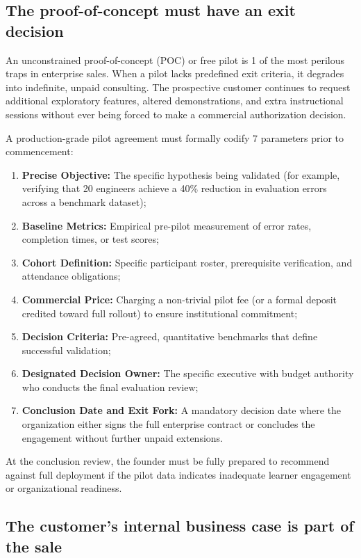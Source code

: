 \subsection{The proof-of-concept must have an exit decision}

An unconstrained proof-of-concept (POC) or free pilot is 1 of the most perilous traps in enterprise sales. When a pilot lacks predefined exit criteria, it degrades into indefinite, unpaid consulting. The prospective customer continues to request additional exploratory features, altered demonstrations, and extra instructional sessions without ever being forced to make a commercial authorization decision.

A production-grade pilot agreement must formally codify 7 parameters prior to commencement:
\begin{enumerate}
\item \textbf{Precise Objective:} The specific hypothesis being validated (for example, verifying that 20 engineers achieve a 40\% reduction in evaluation errors across a benchmark dataset);
\item \textbf{Baseline Metrics:} Empirical pre-pilot measurement of error rates, completion times, or test scores;
\item \textbf{Cohort Definition:} Specific participant roster, prerequisite verification, and attendance obligations;
\item \textbf{Commercial Price:} Charging a non-trivial pilot fee (or a formal deposit credited toward full rollout) to ensure institutional commitment;
\item \textbf{Decision Criteria:} Pre-agreed, quantitative benchmarks that define successful validation;
\item \textbf{Designated Decision Owner:} The specific executive with budget authority who conducts the final evaluation review;
\item \textbf{Conclusion Date and Exit Fork:} A mandatory decision date where the organization either signs the full enterprise contract or concludes the engagement without further unpaid extensions.
\end{enumerate}
At the conclusion review, the founder must be fully prepared to recommend against full deployment if the pilot data indicates inadequate learner engagement or organizational readiness.

\subsection{The customer's internal business case is part of the sale}

